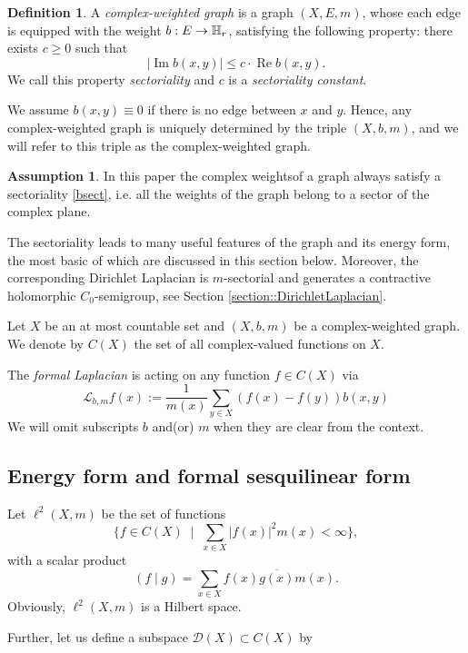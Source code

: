 \documentclass[a4paper,11pt]{amsart}
\theoremstyle{definition}
\newtheorem{definition}[theorem]{Definition}
\newtheorem{assumption}[theorem]{Assumption}
\renewcommand{\Re}{\operatorname{Re}}%
\renewcommand{\Im}{\operatorname{Im}}%
\renewcommand{\L}{\mathcal{L}}
\begin{document}
\begin{definition}\label{def::complexweightedgraph}
A {\em complex-weighted graph} is a graph $(X,E,m)$, whose each edge is equipped with the weight $b:E\to \Bbb H_r$, satisfying the following property: there exists $c\ge 0$ such that
\begin{equation}\label{bsect}
\left|\Im b(x,y)\right|\le c \cdot \Re b(x,y).
\end{equation}
We call this property {\em sectoriality} and $c$ is a {\em sectoriality constant}.
\end{definition}
We assume $b(x,y)\equiv 0$ if there is no edge between $x$ and $y$. Hence, any complex-weighted graph is uniquely determined by the triple $(X,b,m)$, and we will refer to this triple as the complex-weighted graph.

\begin{assumption}
In this paper the complex weightsof a graph always satisfy a sectoriality \eqref{bsect}, i.e. all the weights of the graph belong to a sector of the complex plane.
\end{assumption}

The sectoriality  leads to many useful features of the graph and its energy form, the most basic of which are discussed in this section below. Moreover, the corresponding Dirichlet Laplacian is $m$-sectorial and generates a contractive holomorphic $C_0$-semigroup, see Section \ref{section::DirichletLaplacian}.



Let $X$ be an at most countable set and $(X,b,m)$ be a complex-weighted graph. We denote by $C(X)$ the set of all complex-valued functions on $X$.


The {\em formal Laplacian} is acting on  any function $f\in C(X)$ via
$$
\L_{b,m} f(x):=\dfrac{1}{m(x)}\sum_{y\in X} (f(x)-f(y)) b(x,y)
$$
We will omit subscripts $b$ and(or) $m$ when they are  clear from the context.



\subsection{Energy form and formal sesquilinear form }


 Let $\ell^2(X,m)$ be the set of functions
$$\{f\in C(X)\;\mid\;\sum_{x\in X}|f(x)|^2m(x)<\infty\big\},
$$
with a scalar product
$$
(f\mid g)=\sum_{x\in X} f(x)\overline{g(x)}m(x).
$$
Obviously, $\ell^2(X,m)$  is a Hilbert space.

Further, let us define a subspace $\mathcal D(X)\subset C(X)$ by
\end{document}
